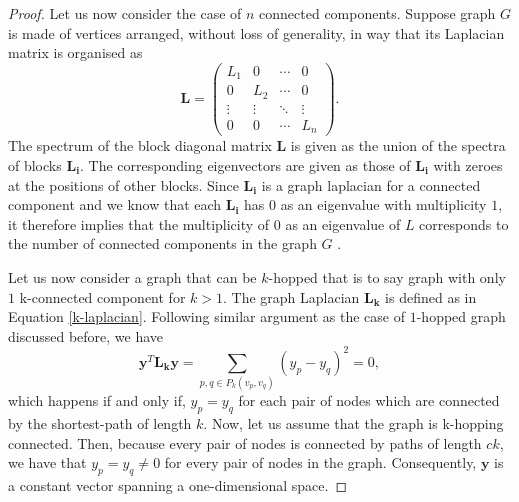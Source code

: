 \documentclass[10pt,a4paper]{article}
\begin{document}
\begin{proof}
    	    	Let us now consider the case of $n$ connected components. Suppose graph $G$ is made of vertices arranged, without loss of generality, in way that its Laplacian matrix is organised as 
    	    	\begin{equation*}
    	    	\mathbf{L} = \begin{pmatrix}
    	    	L_{1} & 0 & \cdots & 0 \\
    	    	0 & L_{2} & \cdots & 0\\
    	    	\vdots& \vdots & \ddots & \vdots \\
    	    	0 & 0 & \cdots & L_{n}
    	    	\end{pmatrix}.
    	    	\end{equation*}
    	    	The spectrum of the block diagonal matrix $\mathbf{L}$ is given as the union of the spectra of blocks $\mathbf{L_i}$. The corresponding eigenvectors are given as those of $\mathbf{L_i}$ with zeroes at the positions of other blocks.
    	    	Since $\mathbf{L_i}$ is a graph laplacian for a connected component and we know that each $\mathbf{L_i}$ has $0$ as an eigenvalue with multiplicity $1$, it therefore implies that the multiplicity of $0$ as an eigenvalue of $L$ corresponds to the number of connected components in the graph $G$ \citep{von2007tutorial}. 
    	    	
    	    	Let us now consider a graph that can be $k$-hopped that is to say graph with only $1$ k-connected component for $k>1$. The graph Laplacian $\mathbf{L_k}$ is defined as in Equation \ref{k-laplacian}. Following similar argument as the case of $1$-hopped graph discussed before, we have
    	    	\begin{equation}
    	    	\mathbf{y}^T \mathbf{L_k} \mathbf{y} = \sum_{p,q \in P_k(v_p,v_q)} (y_p-y_q)^2 = 0,  
    	    	\end{equation} 		
    	    	which happens if and only if, $y_p =y_q$ for each pair of nodes which are connected by the shortest-path of length $k$. Now, let us assume that the graph is k-hopping connected. Then, because every pair of nodes is connected by paths of length $ck$, we have that $y_p =y_q \neq 0$ for every pair of nodes in the graph. Consequently, $\mathbf{y}$ is a constant vector spanning a one-dimensional space.
    	    	

\end{proof}
\end{document}
